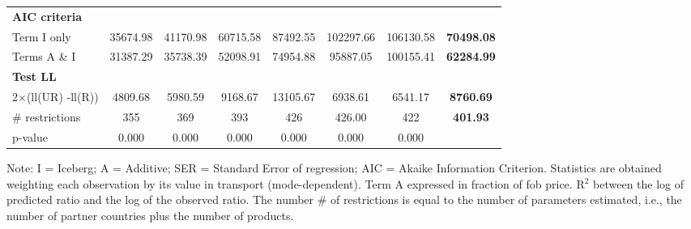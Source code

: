 \documentclass[a4paper,11pt]{article}
\begin{document}
\begin{table}[htbp]
\begin{center}
\begin{tabular}{lccccccc}
\textbf{AIC criteria} &       &       &       &       &       & \multicolumn{1}{c}{} & \multicolumn{1}{c}{\textbf{}} \\
Term I only & 35674.98 & 41170.98 & 60715.58 & 87492.55 & \multicolumn{1}{c}{102297.66} & \multicolumn{1}{c}{106130.58} & \multicolumn{1}{c}{\textbf{70498.08}} \\
Terms A \& I & 31387.29 & 35738.39 & 52098.91 & 74954.88 & \multicolumn{1}{c}{95887.05} & \multicolumn{1}{c}{100155.41} & \multicolumn{1}{c}{\textbf{62284.99}} \\
\textbf{Test LL} &       &       &       &       & \multicolumn{1}{c}{} &       &  \\
2$\times$(ll(UR) -ll(R)) & 4809.68 & 5980.59 & 9168.67 & 13105.67 & \multicolumn{1}{c}{6938.61} & \multicolumn{1}{c}{6541.17} & \multicolumn{1}{c}{\textbf{8760.69}} \\
\# restrictions  & 355   & 369   & 393   & 426   & \multicolumn{1}{c}{426.00} & \multicolumn{1}{c}{422} & \multicolumn{1}{c}{\textbf{401.93}} \\
p-value & 0.000 & 0.000 & 0.000 & 0.000 & \multicolumn{1}{c}{0.000} & \multicolumn{1}{c}{0.000} & \multicolumn{1}{c}{\textbf{}} \\


\hline\hline

    \end{tabular}%
    \end{center}
  \label{tab:good_fit_air}%
  \tiny{Note: I = Iceberg; A = Additive; SER = Standard Error of regression; AIC = Akaike Information Criterion. Statistics are obtained weighting each observation by its value in transport (mode-dependent). Term A expressed in fraction of fob price. R$^{2}$ between the log of predicted ratio and the log of the observed ratio. The number \# of restrictions is equal to the number of parameters estimated, i.e., the number of partner countries plus the number of products.}
\end{table}%
\end{document}
